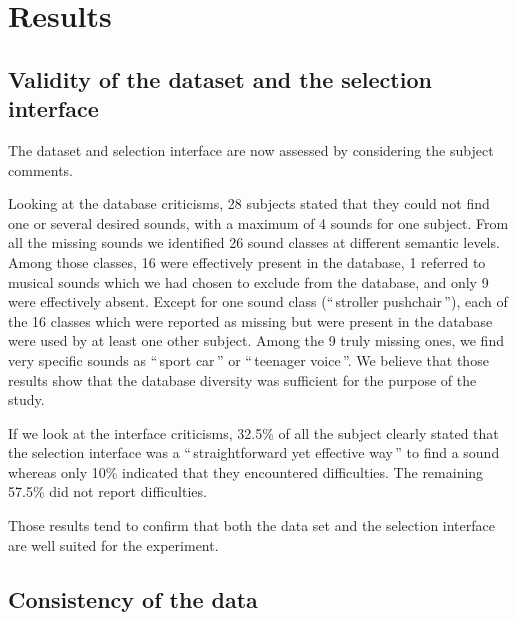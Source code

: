 \documentclass[twoside,twocolumn]{article}
\begin{document}
 
\section{Results}

\subsection{Validity of the  dataset and the selection interface}
\label{sec:datasetAnalyses}

The dataset and selection interface are now assessed by considering the subject comments. 

Looking at the database criticisms, 28 subjects stated that they could not find one or several desired sounds, with a maximum of 4 sounds for one subject. From all the missing sounds we identified 26 sound classes at different semantic levels. Among those classes, 16 were effectively present in the database, 1 referred to musical sounds which we had chosen to exclude from the database, and only 9 were effectively absent. Except for one sound class (``\,stroller pushchair\,''), each of the 16 classes which were reported as missing but were present in the database were used by at least one other subject. Among the 9 truly missing ones, we find very specific sounds as ``\,sport car\,'' or ``\,teenager voice\,''. We believe  that those results show that the database diversity was sufficient for the purpose of the study. 

If we look at the interface criticisms, 32.5\% of all the subject clearly stated that the selection interface was a ``\,straightforward yet effective way\,'' to find a sound whereas only 10\% indicated that they encountered difficulties. The remaining 57.5\% did not report difficulties. 

Those results tend to confirm that both the data set and the selection interface are well suited for the experiment.

\subsection{Consistency of the data}
\end{document}
